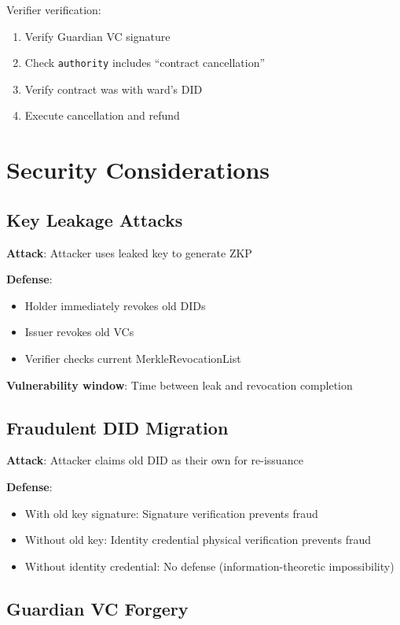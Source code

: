 Verifier verification:
\begin{enumerate}
  \item Verify Guardian VC signature
  \item Check \texttt{authority} includes ``contract cancellation''
  \item Verify contract was with ward's DID
  \item Execute cancellation and refund
\end{enumerate}

\section{Security Considerations}

\subsection{Key Leakage Attacks}

\textbf{Attack}: Attacker uses leaked key to generate ZKP

\textbf{Defense}:
\begin{itemize}
  \item Holder immediately revokes old DIDs
  \item Issuer revokes old VCs
  \item Verifier checks current MerkleRevocationList
\end{itemize}

\textbf{Vulnerability window}: Time between leak and revocation completion

\subsection{Fraudulent DID Migration}

\textbf{Attack}: Attacker claims old DID as their own for re-issuance

\textbf{Defense}:
\begin{itemize}
  \item With old key signature: Signature verification prevents fraud
  \item Without old key: Identity credential physical verification prevents fraud
  \item Without identity credential: No defense (information-theoretic impossibility)
\end{itemize}

\subsection{Guardian VC Forgery}

